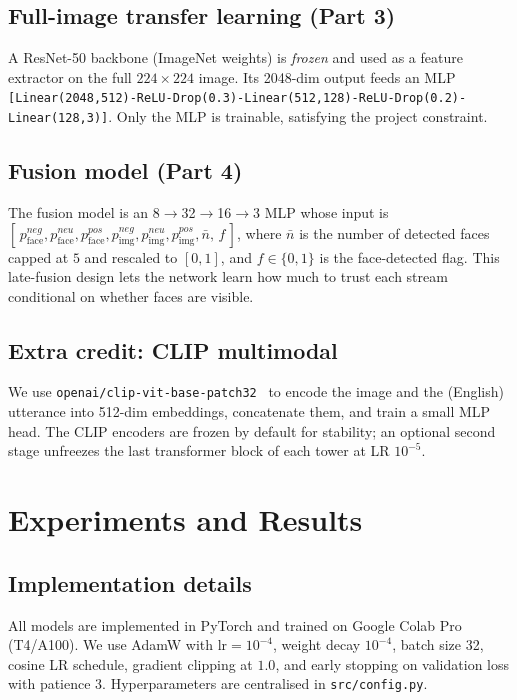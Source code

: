 \documentclass[conference]{IEEEtran}
\begin{document}
\subsection{Full-image transfer learning (Part 3)}
A ResNet-50 backbone (ImageNet weights) is \emph{frozen} and used as a
feature extractor on the full $224{\times}224$ image. Its 2048-dim
output feeds an MLP \texttt{[Linear(2048,512)-ReLU-Drop(0.3)-Linear(512,128)-ReLU-Drop(0.2)-Linear(128,3)]}.
Only the MLP is trainable, satisfying the project constraint.

\subsection{Fusion model (Part 4)}
The fusion model is an 8$\to$32$\to$16$\to$3 MLP whose input is
$[\,p_{\text{face}}^{neg},p_{\text{face}}^{neu},p_{\text{face}}^{pos},
p_{\text{img}}^{neg},p_{\text{img}}^{neu},p_{\text{img}}^{pos},
\bar n,\,f\,]$, where $\bar n$ is the number of detected faces capped
at $5$ and rescaled to $[0,1]$, and $f\in\{0,1\}$ is the face-detected
flag. This late-fusion design lets the network learn how much to trust
each stream conditional on whether faces are visible.

\subsection{Extra credit: CLIP multimodal}
We use \texttt{openai/clip-vit-base-patch32}~\cite{radford2021clip} to
encode the image and the (English) utterance into 512-dim embeddings,
concatenate them, and train a small MLP head. The CLIP encoders are
frozen by default for stability; an optional second stage unfreezes the
last transformer block of each tower at LR $10^{-5}$.

\section{Experiments and Results}\label{sec:exp}

\subsection{Implementation details}
All models are implemented in PyTorch and trained on Google Colab Pro
(T4/A100). We use AdamW with $\text{lr}=10^{-4}$, weight decay
$10^{-4}$, batch size 32, cosine LR schedule, gradient clipping at
$1.0$, and early stopping on validation loss with patience 3.
Hyperparameters are centralised in \texttt{src/config.py}.
\end{document}
